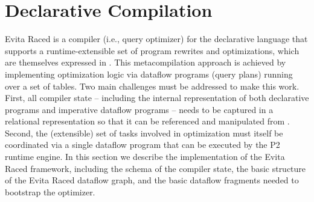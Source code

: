 
\section{Declarative Compilation}
\label{ch:evita:sec:compile}

Evita Raced is a compiler (i.e., query optimizer) for the \OVERLOG
declarative language that supports a runtime-extensible set of program
rewrites and optimizations, which are themselves expressed in \OVERLOG.
This metacompilation approach is achieved by implementing optimization
logic via dataflow programs  (query plans) running over a set of tables.  Two
main challenges must be addressed to make this work.  First, all
compiler state -- including the internal representation of both
declarative \OVERLOG programs and imperative dataflow programs -- needs
to be captured in a relational representation so that it can be
referenced and manipulated from \OVERLOG.  Second, the (extensible) set
of tasks involved in optimization must itself be coordinated via a
single dataflow program that can be executed by the P2 runtime engine.
In this section we describe the implementation of the Evita Raced
framework, including the schema of the compiler state, the basic
structure of the Evita Raced dataflow graph, and the basic dataflow
fragments needed to bootstrap the optimizer.

